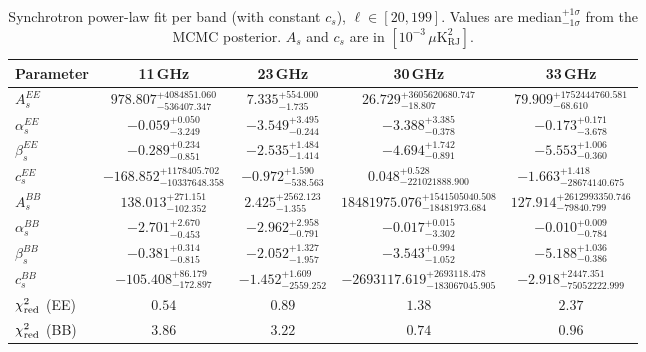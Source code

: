 \begin{table}[htbp]
\centering
\caption{Synchrotron power-law fit per band (with constant $c_s$), $\ell \in [20, 199]$. Values are median$^{+1\sigma}_{-1\sigma}$ from the MCMC posterior. $A_s$ and $c_s$ are in $[10^{-3}\,\mu\mathrm{K}^2_\mathrm{RJ}]$.}
\label{tab:sync_single_band_withc_ell20-199}
\begin{tabular}{lcccc}
\toprule
Parameter & 11\,GHz & 23\,GHz & 30\,GHz & 33\,GHz \\
\midrule
$A_s^{EE}$ & $978.807^{+4084851.060}_{-536407.347}$ & $7.335^{+554.000}_{-1.735}$ & $26.729^{+3605620680.747}_{-18.807}$ & $79.909^{+1752444760.581}_{-68.610}$ \\
$\alpha_s^{EE}$ & $-0.059^{+0.050}_{-3.249}$ & $-3.549^{+3.495}_{-0.244}$ & $-3.388^{+3.385}_{-0.378}$ & $-0.173^{+0.171}_{-3.678}$ \\
$\beta_s^{EE}$ & $-0.289^{+0.234}_{-0.851}$ & $-2.535^{+1.484}_{-1.414}$ & $-4.694^{+1.742}_{-0.891}$ & $-5.553^{+1.006}_{-0.360}$ \\
$c_s^{EE}$ & $-168.852^{+1178405.702}_{-10337648.358}$ & $-0.972^{+1.590}_{-538.563}$ & $0.048^{+0.528}_{-221021888.900}$ & $-1.663^{+1.418}_{-28674140.675}$ \\
\midrule
$A_s^{BB}$ & $138.013^{+271.151}_{-102.352}$ & $2.425^{+2562.123}_{-1.355}$ & $18481975.076^{+1541505040.508}_{-18481973.684}$ & $127.914^{+2612993350.746}_{-79840.799}$ \\
$\alpha_s^{BB}$ & $-2.701^{+2.670}_{-0.453}$ & $-2.962^{+2.958}_{-0.791}$ & $-0.017^{+0.015}_{-3.302}$ & $-0.010^{+0.009}_{-0.784}$ \\
$\beta_s^{BB}$ & $-0.381^{+0.314}_{-0.815}$ & $-2.052^{+1.327}_{-1.957}$ & $-3.543^{+0.994}_{-1.052}$ & $-5.188^{+1.036}_{-0.386}$ \\
$c_s^{BB}$ & $-105.408^{+86.179}_{-172.897}$ & $-1.452^{+1.609}_{-2559.252}$ & $-2693117.619^{+2693118.478}_{-183067045.905}$ & $-2.918^{+2447.351}_{-75052222.999}$ \\
\midrule
$\chi^2_{\rm red}$ (EE) & $0.54$ & $0.89$ & $1.38$ & $2.37$ \\
$\chi^2_{\rm red}$ (BB) & $3.86$ & $3.22$ & $0.74$ & $0.96$ \\
\bottomrule
\end{tabular}
\end{table}
